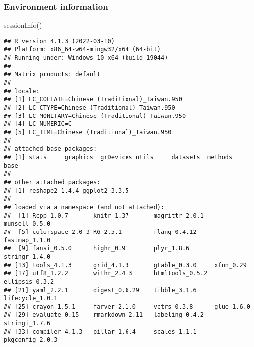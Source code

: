 \documentclass[
]{article}
\newenvironment{Shaded}{\begin{snugshade}}{\end{snugshade}}
\newcommand{\FunctionTok}[1]{\textcolor[rgb]{0.00,0.00,0.00}{#1}}
\newcommand{\NormalTok}[1]{#1}
\begin{document}
\hypertarget{environment-information}{%
\subsubsection{Environment information}\label{environment-information}}

\begin{Shaded}
\begin{Highlighting}[]
\FunctionTok{sessionInfo}\NormalTok{()}
\end{Highlighting}
\end{Shaded}

\begin{verbatim}
## R version 4.1.3 (2022-03-10)
## Platform: x86_64-w64-mingw32/x64 (64-bit)
## Running under: Windows 10 x64 (build 19044)
## 
## Matrix products: default
## 
## locale:
## [1] LC_COLLATE=Chinese (Traditional)_Taiwan.950 
## [2] LC_CTYPE=Chinese (Traditional)_Taiwan.950   
## [3] LC_MONETARY=Chinese (Traditional)_Taiwan.950
## [4] LC_NUMERIC=C                                
## [5] LC_TIME=Chinese (Traditional)_Taiwan.950    
## 
## attached base packages:
## [1] stats     graphics  grDevices utils     datasets  methods   base     
## 
## other attached packages:
## [1] reshape2_1.4.4 ggplot2_3.3.5 
## 
## loaded via a namespace (and not attached):
##  [1] Rcpp_1.0.7       knitr_1.37       magrittr_2.0.1   munsell_0.5.0   
##  [5] colorspace_2.0-3 R6_2.5.1         rlang_0.4.12     fastmap_1.1.0   
##  [9] fansi_0.5.0      highr_0.9        plyr_1.8.6       stringr_1.4.0   
## [13] tools_4.1.3      grid_4.1.3       gtable_0.3.0     xfun_0.29       
## [17] utf8_1.2.2       withr_2.4.3      htmltools_0.5.2  ellipsis_0.3.2  
## [21] yaml_2.2.1       digest_0.6.29    tibble_3.1.6     lifecycle_1.0.1 
## [25] crayon_1.5.1     farver_2.1.0     vctrs_0.3.8      glue_1.6.0      
## [29] evaluate_0.15    rmarkdown_2.11   labeling_0.4.2   stringi_1.7.6   
## [33] compiler_4.1.3   pillar_1.6.4     scales_1.1.1     pkgconfig_2.0.3
\end{verbatim}
\end{document}
